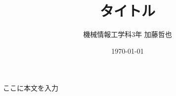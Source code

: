 \documentclass[paper=a4paper,fontsize=10pt]{jlreq}
\begin{document}
\title{タイトル}
\author{機械情報工学科3年 加藤哲也}
\date{\today}
\maketitle

\tableofcontents

ここに本文を入力

\end{document}
